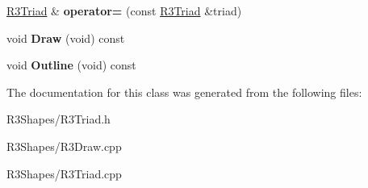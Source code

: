 \begin{DoxyCompactItemize}
\item 
\hyperlink{class_r3_triad}{R3\+Triad} \& {\bfseries operator=} (const \hyperlink{class_r3_triad}{R3\+Triad} \&triad)\hypertarget{class_r3_triad_a04ea745b56fab200405d2245e361de08}{}\label{class_r3_triad_a04ea745b56fab200405d2245e361de08}

\item 
void {\bfseries Draw} (void) const \hypertarget{class_r3_triad_a97b3418977e6ecb792083cc5f8800f08}{}\label{class_r3_triad_a97b3418977e6ecb792083cc5f8800f08}

\item 
void {\bfseries Outline} (void) const \hypertarget{class_r3_triad_ab9c3fd6aac77df8af82d85934f423a08}{}\label{class_r3_triad_ab9c3fd6aac77df8af82d85934f423a08}

\end{DoxyCompactItemize}


The documentation for this class was generated from the following files\+:\begin{DoxyCompactItemize}
\item 
R3\+Shapes/R3\+Triad.\+h\item 
R3\+Shapes/R3\+Draw.\+cpp\item 
R3\+Shapes/R3\+Triad.\+cpp\end{DoxyCompactItemize}
